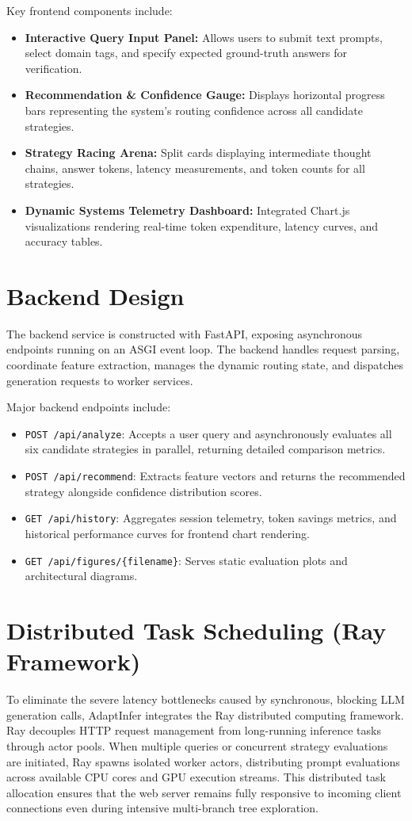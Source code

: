 \documentclass[12pt,a4paper]{report}
\begin{document}
Key frontend components include:
\begin{itemize}[leftmargin=*]
    \item \textbf{Interactive Query Input Panel:} Allows users to submit text prompts, select domain tags, and specify expected ground-truth answers for verification.
    \item \textbf{Recommendation \& Confidence Gauge:} Displays horizontal progress bars representing the system's routing confidence across all candidate strategies.
    \item \textbf{Strategy Racing Arena:} Split cards displaying intermediate thought chains, answer tokens, latency measurements, and token counts for all strategies.
    \item \textbf{Dynamic Systems Telemetry Dashboard:} Integrated Chart.js visualizations rendering real-time token expenditure, latency curves, and accuracy tables.
\end{itemize}

\section{Backend Design}
\label{sec:backend_design}
The backend service is constructed with FastAPI, exposing asynchronous endpoints running on an ASGI event loop. The backend handles request parsing, coordinate feature extraction, manages the dynamic routing state, and dispatches generation requests to worker services.

Major backend endpoints include:
\begin{itemize}[leftmargin=*]
    \item \texttt{POST /api/analyze}: Accepts a user query and asynchronously evaluates all six candidate strategies in parallel, returning detailed comparison metrics.
    \item \texttt{POST /api/recommend}: Extracts feature vectors and returns the recommended strategy alongside confidence distribution scores.
    \item \texttt{GET /api/history}: Aggregates session telemetry, token savings metrics, and historical performance curves for frontend chart rendering.
    \item \texttt{GET /api/figures/\{filename\}}: Serves static evaluation plots and architectural diagrams.
\end{itemize}

\section{Distributed Task Scheduling (Ray Framework)}
\label{sec:distributed_scheduling}
To eliminate the severe latency bottlenecks caused by synchronous, blocking LLM generation calls, AdaptInfer integrates the Ray distributed computing framework. Ray decouples HTTP request management from long-running inference tasks through actor pools. When multiple queries or concurrent strategy evaluations are initiated, Ray spawns isolated worker actors, distributing prompt evaluations across available CPU cores and GPU execution streams. This distributed task allocation ensures that the web server remains fully responsive to incoming client connections even during intensive multi-branch tree exploration.
\end{document}
